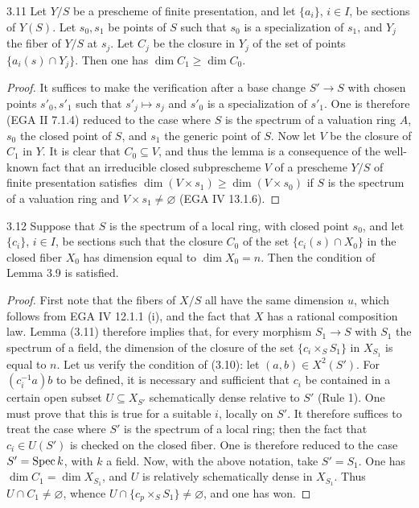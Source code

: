 \begin{lemma}{3.11}\label{XVIII.3.11}
Let \(Y/S\) be a prescheme
of finite presentation,
and let \(\{a_i\}\), \(i\in I\),
be sections of \(Y(S)\).
Let \(s_0,s_1\) be points
of \(S\) such that \(s_0\)
is a specialization of
\(s_1\), and \(Y_j\) the
fiber of \(Y/S\) at \(s_j\).
Let \(C_j\) be the
closure in \(Y_j\)
of the set of points
\(\{a_i(s)\cap Y_j\}\).
Then one has \(\dim C_1\geq\dim C_0\).
\end{lemma}
\begin{proof}
It suffices to make the
verification after a
base change \(S'\to S\)
with chosen points
\(s'_0,s'_1\) such that
\(s'_j\mapsto s_j\)
and \(s'_0\) is a
specialization of \(s'_1\).
One is therefore (EGA II 7.1.4)
reduced to the case
where \(S\) is the
spectrum of a valuation
ring \(A\), \(s_0\)
the closed point of \(S\),
and \(s_1\) the generic
point of \(S\).
Now let \(V\) be the
closure of \(C_1\) in
\(Y\).
It is clear that
\(C_0\subseteq V\),
and thus the lemma
is a consequence of
the \og well-known\fg{}
fact that an irreducible
closed subprescheme \(V\)
of a prescheme \(Y/S\)
of finite presentation
satisfies
\(\dim(V\times s_1)\geq\dim(V\times s_0)\)
if \(S\) is the
spectrum of a valuation
ring and \(V\times s_1\ne\varnothing\)
(EGA IV 13.1.6).
\end{proof}
\begin{lemma}{3.12}\label{XVIII.3.12}
Suppose that \(S\) is
the spectrum of a
local ring, with closed
point \(s_0\), and
let \(\{c_i\}\), \(i\in I\),
be sections such that
the closure \(C_0\)
of the set
\(\{c_i(s)\cap X_0\}\)
in the closed fiber
\(X_0\) has dimension
equal to \(\dim X_0=n\).
Then the condition of
Lemma 3.9 is satisfied.
\end{lemma}
\begin{proof}
First note that the
fibers of \(X/S\)
all have the same
dimension \(u\), which
follows from EGA IV
12.1.1 (i), and the
fact that \(X\) has
a rational composition
law.
Lemma (3.11) therefore
implies that, for every
morphism \(S_1\to S\)
with \(S_1\) the
spectrum of a field,
the dimension of the
closure of the set
\(\{c_i\times_S S_1\}\)
in \(X_{S_1}\)
is equal to \(n\).
Let us verify the
condition of (3.10):
let \((a,b)\in X^2(S')\).
For \((c_i^{-1}a)b\)
to be defined, it is
necessary and sufficient
that \(c_i\) be
contained in a certain
open subset \(U\subseteq X_{S'}\)
schematically dense
relative to \(S'\)
(Rule 1).
One must prove that
this is true for a
suitable \(i\), locally
on \(S'\).
It therefore suffices
to treat the case
where \(S'\) is the
spectrum of a local
ring; then the fact
that \(c_i\in U(S')\)
is checked on the
closed fiber.
One is therefore
reduced to the case
\(S'=\operatorname{Spec} k\),
with \(k\) a field.
Now, with the above
notation, take \(S'=S_1\).
One has \(\dim C_1=\dim X_{S_1}\),
and \(U\) is relatively
schematically dense
in \(X_{S_1}\).
Thus \(U\cap C_1\ne\varnothing\),
whence \(U\cap\{c_p\times_S S_1\}\ne\varnothing\),
and one has won.
\end{proof}

